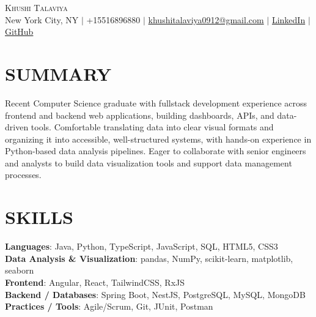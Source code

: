 \documentclass[letterpaper,11pt]{article}
\begin{document}
\begin{center}
    {\Huge \scshape Khushi Talaviya} \\ \vspace{2pt}
    \vspace{4pt}
    \small
    New York City, NY $|$
    \small
    +15516896880 $|$
    \href{mailto:khushitalaviya0912@gmail.com}{khushitalaviya0912@gmail.com} $|$
    \href{https://www.linkedin.com/in/khushitalaviya/}{LinkedIn} $|$
    \href{https://github.com/talaviyakhushi}{GitHub}
\end{center}

\section{SUMMARY}
\vspace{5pt}
\small{Recent Computer Science graduate with fullstack development experience across frontend and backend web applications, building dashboards, APIs, and data-driven tools. Comfortable translating data into clear visual formats and organizing it into accessible, well-structured systems, with hands-on experience in Python-based data analysis pipelines. Eager to collaborate with senior engineers and analysts to build data visualization tools and support data management processes.}

\vspace{2pt}
\section{SKILLS}
\vspace{5pt}
\begin{itemize}[leftmargin=0in, label={}]
\small{\item{
\textbf{Languages}{: Java, Python, TypeScript, JavaScript, SQL, HTML5, CSS3} \\
\textbf{Data Analysis \& Visualization}{: pandas, NumPy, scikit-learn, matplotlib, seaborn} \\
\textbf{Frontend}{: Angular, React, TailwindCSS, RxJS} \\
\textbf{Backend / Databases}{: Spring Boot, NestJS, PostgreSQL, MySQL, MongoDB} \\
\textbf{Practices / Tools}{: Agile/Scrum, Git, JUnit, Postman}
}}
\end{itemize}
\vspace{-10pt}

\end{document}
